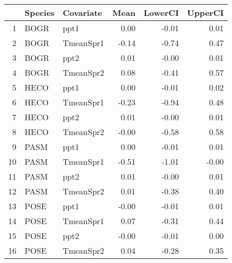 \begin{table}[ht]
\centering
\begin{tabular}{rllrrr}
  \hline
 & Species & Covariate & Mean & LowerCI & UpperCI \\ 
  \hline
1 & BOGR & ppt1 & 0.00 & -0.01 & 0.01 \\ 
  2 & BOGR & TmeanSpr1 & -0.14 & -0.74 & 0.47 \\ 
  3 & BOGR & ppt2 & 0.01 & -0.00 & 0.01 \\ 
  4 & BOGR & TmeanSpr2 & 0.08 & -0.41 & 0.57 \\ 
  5 & HECO & ppt1 & 0.00 & -0.01 & 0.02 \\ 
  6 & HECO & TmeanSpr1 & -0.23 & -0.94 & 0.48 \\ 
  7 & HECO & ppt2 & 0.01 & -0.00 & 0.01 \\ 
  8 & HECO & TmeanSpr2 & -0.00 & -0.58 & 0.58 \\ 
  9 & PASM & ppt1 & 0.00 & -0.01 & 0.01 \\ 
  10 & PASM & TmeanSpr1 & -0.51 & -1.01 & -0.00 \\ 
  11 & PASM & ppt2 & 0.01 & -0.00 & 0.01 \\ 
  12 & PASM & TmeanSpr2 & 0.01 & -0.38 & 0.40 \\ 
  13 & POSE & ppt1 & -0.00 & -0.01 & 0.01 \\ 
  14 & POSE & TmeanSpr1 & 0.07 & -0.31 & 0.44 \\ 
  15 & POSE & ppt2 & -0.00 & -0.01 & 0.00 \\ 
  16 & POSE & TmeanSpr2 & 0.04 & -0.28 & 0.35 \\ 
   \hline
\end{tabular}
\end{table}
